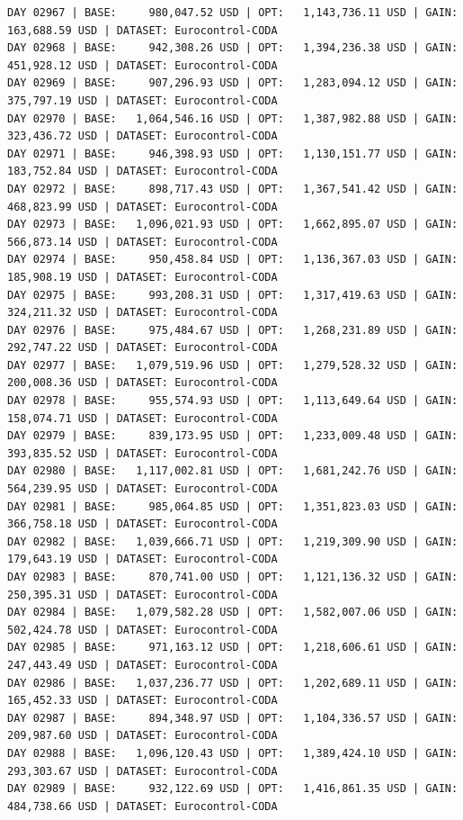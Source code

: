 \documentclass[11pt,a4paper]{article}
\begin{document}
\begin{verbatim}
DAY 02967 | BASE:     980,047.52 USD | OPT:   1,143,736.11 USD | GAIN: 163,688.59 USD | DATASET: Eurocontrol-CODA
DAY 02968 | BASE:     942,308.26 USD | OPT:   1,394,236.38 USD | GAIN: 451,928.12 USD | DATASET: Eurocontrol-CODA
DAY 02969 | BASE:     907,296.93 USD | OPT:   1,283,094.12 USD | GAIN: 375,797.19 USD | DATASET: Eurocontrol-CODA
DAY 02970 | BASE:   1,064,546.16 USD | OPT:   1,387,982.88 USD | GAIN: 323,436.72 USD | DATASET: Eurocontrol-CODA
DAY 02971 | BASE:     946,398.93 USD | OPT:   1,130,151.77 USD | GAIN: 183,752.84 USD | DATASET: Eurocontrol-CODA
DAY 02972 | BASE:     898,717.43 USD | OPT:   1,367,541.42 USD | GAIN: 468,823.99 USD | DATASET: Eurocontrol-CODA
DAY 02973 | BASE:   1,096,021.93 USD | OPT:   1,662,895.07 USD | GAIN: 566,873.14 USD | DATASET: Eurocontrol-CODA
DAY 02974 | BASE:     950,458.84 USD | OPT:   1,136,367.03 USD | GAIN: 185,908.19 USD | DATASET: Eurocontrol-CODA
DAY 02975 | BASE:     993,208.31 USD | OPT:   1,317,419.63 USD | GAIN: 324,211.32 USD | DATASET: Eurocontrol-CODA
DAY 02976 | BASE:     975,484.67 USD | OPT:   1,268,231.89 USD | GAIN: 292,747.22 USD | DATASET: Eurocontrol-CODA
DAY 02977 | BASE:   1,079,519.96 USD | OPT:   1,279,528.32 USD | GAIN: 200,008.36 USD | DATASET: Eurocontrol-CODA
DAY 02978 | BASE:     955,574.93 USD | OPT:   1,113,649.64 USD | GAIN: 158,074.71 USD | DATASET: Eurocontrol-CODA
DAY 02979 | BASE:     839,173.95 USD | OPT:   1,233,009.48 USD | GAIN: 393,835.52 USD | DATASET: Eurocontrol-CODA
DAY 02980 | BASE:   1,117,002.81 USD | OPT:   1,681,242.76 USD | GAIN: 564,239.95 USD | DATASET: Eurocontrol-CODA
DAY 02981 | BASE:     985,064.85 USD | OPT:   1,351,823.03 USD | GAIN: 366,758.18 USD | DATASET: Eurocontrol-CODA
DAY 02982 | BASE:   1,039,666.71 USD | OPT:   1,219,309.90 USD | GAIN: 179,643.19 USD | DATASET: Eurocontrol-CODA
DAY 02983 | BASE:     870,741.00 USD | OPT:   1,121,136.32 USD | GAIN: 250,395.31 USD | DATASET: Eurocontrol-CODA
DAY 02984 | BASE:   1,079,582.28 USD | OPT:   1,582,007.06 USD | GAIN: 502,424.78 USD | DATASET: Eurocontrol-CODA
DAY 02985 | BASE:     971,163.12 USD | OPT:   1,218,606.61 USD | GAIN: 247,443.49 USD | DATASET: Eurocontrol-CODA
DAY 02986 | BASE:   1,037,236.77 USD | OPT:   1,202,689.11 USD | GAIN: 165,452.33 USD | DATASET: Eurocontrol-CODA
DAY 02987 | BASE:     894,348.97 USD | OPT:   1,104,336.57 USD | GAIN: 209,987.60 USD | DATASET: Eurocontrol-CODA
DAY 02988 | BASE:   1,096,120.43 USD | OPT:   1,389,424.10 USD | GAIN: 293,303.67 USD | DATASET: Eurocontrol-CODA
DAY 02989 | BASE:     932,122.69 USD | OPT:   1,416,861.35 USD | GAIN: 484,738.66 USD | DATASET: Eurocontrol-CODA

\end{verbatim}
\end{document}
